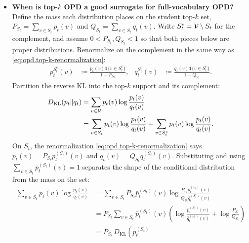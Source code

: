 \begin{itemize}
\begin{remark}
\begin{itemize}
        \item    \textbf{When is top-$k$ OPD a good surrogate for full-vocabulary OPD?}
        Define the mass each distribution places on the student top-$k$ set,
        $P_{S_t}=\sum_{v\in S_t}p_t(v)$ and $Q_{S_t}=\sum_{v\in S_t}q_t(v)$.
        Write $S_t^c={\cal V}\setminus S_t$ for the complement, and assume
        $0<P_{S_t},Q_{S_t}<1$ so that both pieces below are proper distributions.
        Renormalize on the complement in the same way as
        \eqref{eq:opd.top-k-renormalization}:
        \begin{align}
            p_t^{S_t^c}(v)
            &\coloneqq
            \frac{p_t(v)\mathbf{1}\{v\in S_t^c\}}{1-P_{S_t}},
            &
            q_t^{S_t^c}(v)
            &\coloneqq
            \frac{q_t(v)\mathbf{1}\{v\in S_t^c\}}{1-Q_{S_t}}.
            \label{eq:opd.complement-renormalization}
        \end{align}
        Partition the reverse KL into the top-$k$ support and its complement:
        \begin{align}
            D_{\mathrm{KL}}(p_t\|q_t)
            &=
            \sum_{v\in{\cal V}}p_t(v)\log\frac{p_t(v)}{q_t(v)}
            \nonumber\\
            &=
            \sum_{v\in S_t}p_t(v)\log\frac{p_t(v)}{q_t(v)}
            +
            \sum_{v\in S_t^c}p_t(v)\log\frac{p_t(v)}{q_t(v)}.
            \label{eq:opd.kl-split}
        \end{align}
        On $S_t$, the renormalization
        \eqref{eq:opd.top-k-renormalization} says
        $p_t(v)=P_{S_t}\bar p_t^{(S_t)}(v)$ and
        $q_t(v)=Q_{S_t}\bar q_t^{(S_t)}(v)$. Substituting and using
        $\sum_{v\in S_t}\bar p_t^{(S_t)}(v)=1$ separates the shape of the
        conditional distribution from the mass on the set:
        \begin{align}
            \sum_{v\in S_t}p_t(v)\log\frac{p_t(v)}{q_t(v)}
            &=
            \sum_{v\in S_t}
            P_{S_t}\bar p_t^{(S_t)}(v)
            \log\frac{P_{S_t}\bar p_t^{(S_t)}(v)}{Q_{S_t}\bar q_t^{(S_t)}(v)}
            \nonumber\\
            &=
            P_{S_t}
            \sum_{v\in S_t}
            \bar p_t^{(S_t)}(v)
            \left(
                \log\frac{\bar p_t^{(S_t)}(v)}{\bar q_t^{(S_t)}(v)}
                +
                \log\frac{P_{S_t}}{Q_{S_t}}
            \right)
            \nonumber\\
            &=
            P_{S_t}\,
            D_{\mathrm{KL}}\!\left(
                \bar p_t^{(S_t)}

\end{align}
\end{itemize}
\end{remark}
\end{itemize}
